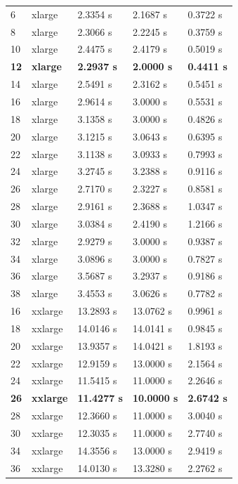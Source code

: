 \documentclass{article}
\begin{document}
\begin{center}
\begin{tabular}{lllll}
 6   &  xlarge   &  2.3354 s   &  2.1687 s   &  0.3722 s            \\
 8   &  xlarge   &  2.3066 s   &  2.2245 s   &  0.3759 s            \\
 10  &  xlarge   &  2.4475 s   &  2.4179 s   &  0.5019 s            \\
\textbf{12}  & \textbf{xlarge}   &  \textbf{2.2937 s}   &  \textbf{2.0000 s}   &  \textbf{0.4411 s}            \\
 14  &  xlarge   &  2.5491 s   &  2.3162 s   &  0.5451 s            \\
 16  &  xlarge   &  2.9614 s   &  3.0000 s   &  0.5531 s            \\
 18  &  xlarge   &  3.1358 s   &  3.0000 s   &  0.4826 s            \\
 20  &  xlarge   &  3.1215 s   &  3.0643 s   &  0.6395 s            \\
 22  &  xlarge   &  3.1138 s   &  3.0933 s   &  0.7993 s            \\
 24  &  xlarge   &  3.2745 s   &  3.2388 s   &  0.9116 s            \\
 26  &  xlarge   &  2.7170 s   &  2.3227 s   &  0.8581 s            \\
 28  &  xlarge   &  2.9161 s   &  2.3688 s   &  1.0347 s            \\
 30  &  xlarge   &  3.0384 s   &  2.4190 s   &  1.2166 s            \\
 32  &  xlarge   &  2.9279 s   &  3.0000 s   &  0.9387 s            \\
 34  &  xlarge   &  3.0896 s   &  3.0000 s   &  0.7827 s            \\
 36  &  xlarge   &  3.5687 s   &  3.2937 s   &  0.9186 s            \\
 38  &  xlarge   &  3.4553 s   &  3.0626 s   &  0.7782 s            \\
 16  &  xxlarge  &  13.2893 s  &  13.0762 s  &  0.9961 s            \\
 18  &  xxlarge  &  14.0146 s  &  14.0141 s  &  0.9845 s            \\
 20  &  xxlarge  &  13.9357 s  &  14.0421 s  &  1.8193 s            \\
 22  &  xxlarge  &  12.9159 s  &  13.0000 s  &  2.1564 s            \\
 24  &  xxlarge  &  11.5415 s  &  11.0000 s  &  2.2646 s            \\
 \textbf{26}  &  \textbf{xxlarge}  &  \textbf{11.4277 s}  &  \textbf{10.0000 s}  &  \textbf{2.6742 s}            \\
 28  &  xxlarge  &  12.3660 s  &  11.0000 s  &  3.0040 s            \\
 30  &  xxlarge  &  12.3035 s  &  11.0000 s  &  2.7740 s            \\
 34  &  xxlarge  &  14.3556 s  &  13.0000 s  &  2.9419 s            \\
 36  &  xxlarge  &  14.0130 s  &  13.3280 s  &  2.2762 s            \\
\end{tabular}
\end{center}
\end{document}
